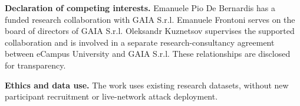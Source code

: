 \noindent\textbf{Declaration of competing interests.} Emanuele Pio De Bernardis has a funded research collaboration with GAIA S.r.l. Emanuele Frontoni serves on the board of directors of GAIA S.r.l. Oleksandr Kuznetsov supervises the supported collaboration and is involved in a separate research-consultancy agreement between eCampus University and GAIA S.r.l. These relationships are disclosed for transparency.

\noindent\textbf{Ethics and data use.} The work uses existing research datasets, without new participant recruitment or live-network attack deployment.

\fi

\FloatBarrier


